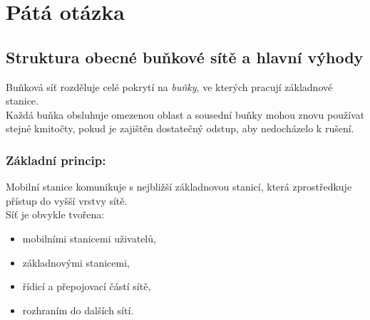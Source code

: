 \chapter{Pátá otázka}
\section{Struktura obecné buňkové sítě a hlavní výhody}
Buňková síť rozděluje celé pokrytí na \textit{buňky}, ve kterých pracují základnové stanice.\\
Každá buňka obsluhuje omezenou oblast a sousední buňky mohou znovu používat stejné kmitočty, pokud je zajištěn dostatečný odstup, aby nedocházelo k rušení.
\subsection{Základní princip:}
Mobilní stanice komunikuje s nejbližší základnovou stanicí, která zprostředkuje přístup do vyšší vrstvy sítě.\\
Síť je obvykle tvořena:
\begin{itemize}
	\item mobilními stanicemi uživatelů,
	\item základnovými stanicemi,
	\item řídicí a přepojovací částí sítě,
	\item rozhraním do dalších sítí.
\end{itemize}
